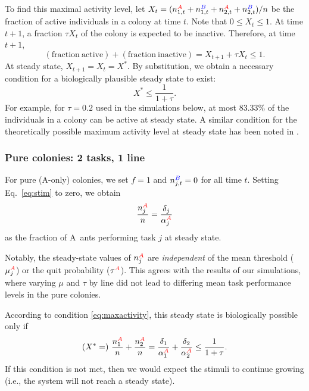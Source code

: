 \documentclass[11pt]{article}
\newcommand{\A}{{\color{red}A}}
\newcommand{\B}{{\color{blue}B}}
\begin{document}
\begin{appendices}
To find this maximal activity level, let $X_t = (n_{1,t}^{\A}+ n_{1,t}^{\B}+ n_{2,t}^{\A}+n_{2,t}^{\B})/n$ be the fraction of active individuals in a colony at time $t$. Note that $0\leq X_t\leq 1$. At time $t+1$, a fraction $\tau X_t$ of the colony is expected to be inactive. Therefore, at time $t+1$,
\begin{equation}
    \mathrm{(fraction\ active)} + \mathrm{(fraction\ inactive)}  = X_{t+1} + \tau X_t \leq 1.
\end{equation}
At steady state, $X_{t+1} = X_{t} = X^*$. By substitution, we obtain a necessary condition for a biologically plausible steady state to exist:
\begin{equation}
    X^* \leq \frac{1}{1+\tau}. \label{eq:maxactivity}
\end{equation}
For example, for $\tau = 0.2$ used in the simulations below, at most $83.33$\% of the individuals in a colony can be active at steady state.
A similar condition for the theoretically possible maximum activity level at steady state has been noted in \cite{gautrais02}.

\subsubsection{Pure colonies: 2 tasks, 1 line} \label{sec:pure}
For pure (\A-only) colonies, we set $f = 1$ and $n_{j,t}^{\B} = 0$ for all time $t$. Setting Eq.~\eqref{eq:stim} to zero, we obtain
\begin{equation}
    \frac{n_j^{\A}}{n} = \frac{\delta_j}{\alpha_j^{\A}}
    \label{eq:ss1}
\end{equation}
as the fraction of \A\ ants performing task $j$ at steady state.

Notably, the steady-state values of $n_j^{\A}$ are \textit{independent} of the mean threshold ($\mu_j^{\A}$) or the quit probability ($\tau^{\A}$). This agrees with the results of our simulations, where varying $\mu$ and $\tau$ by line did not lead to differing mean task performance levels in the pure colonies.

According to condition \eqref{eq:maxactivity}, this steady state is biologically possible only if
\begin{equation}
    (X^* =)\ \frac{n_1^{\A}}{n} + \frac{n_2^{\A}}{n} = \frac{\delta_1}{\alpha_1^{\A}} + \frac{\delta_2}{\alpha_2^{\A} }\leq \frac{1}{1+\tau} \label{eq:cond1}.
\end{equation}
If this condition is not met, then we would expect the stimuli to continue growing (i.e., the system will not reach a steady state).



\end{appendices}
\end{document}
